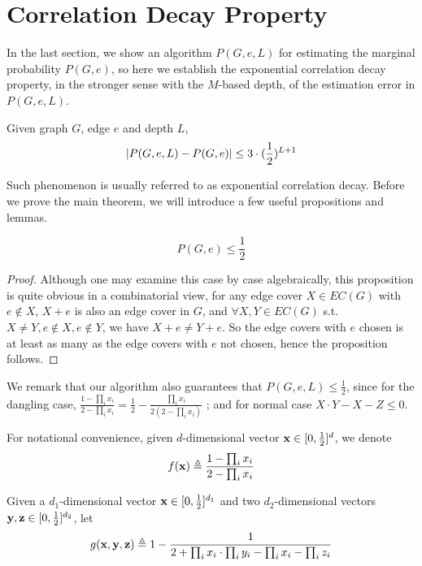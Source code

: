 \section{Correlation Decay Property}

In the last section, we show an algorithm $P(G,e,L)$ for estimating the marginal probability $P(G,e)$,
so here we establish the exponential correlation decay property, in the stronger sense with the
$M$-based depth,
of the estimation error in $P(G,e,L)$.%

\begin{theorem}
	\label{cd-main-theorem}
	Given graph $G$, edge $e$ and depth $L$,
	\[\left\vert P(G,e,L) - P(G,e)\right\vert \leq 3\cdot(\frac{1}{2})^{L+1}\]
\end{theorem}

Such phenomenon is usually referred to as exponential correlation decay. Before we prove the main theorem, we will introduce a few useful propositions and lemmas.

\begin{proposition}
	\[P(G, e) \leq \frac{1}{2}\]
\end{proposition}

\begin{proof}
	Although one may examine this case by case algebraically, this proposition is quite obvious in a combinatorial view, for any edge cover $X \in EC(G)$ with $e \notin X$, $X+e$ is also an edge cover in $G$, and $\forall X,Y \in EC(G)$ s.t. $X \neq Y, e \notin X, e\notin Y$, we have $X+e \neq Y+e$. So the edge covers with $e$ chosen is at least as many as the edge covers with $e$ not chosen, hence the proposition follows.
\end{proof}

We remark that our algorithm also guarantees that $P(G,e,L) \leq \frac{1}{2}$,
since for the dangling case, $\frac{1 - \prod_i x_i}{2 - \prod_i x_i} = \frac{1}{2} - \frac{\prod_i x_i}{2(2 - \prod_i x_i)}$ ; and for normal case $X\cdot Y - X - Z \leq 0$.

For notational convenience, given $d$-dimensional vector ${\bf x} \in [0, \frac{1}{2}]^d$, we denote
\[ f({\bf x}) \triangleq \frac{1- \prod_i x_i}{2 - \prod_i x_i}\]

Given a $d_1$-dimensional vector ${\bf x} \in [0, \frac{1}{2}]^{d_1}$ and two $d_2$-dimensional vectors ${\bf y,z} \in [0, \frac{1}{2}]^{d_2}$, let
\[ g({\bf x,y,z}) \triangleq  1- \frac{1}{2+\prod_i x_i \cdot \prod_i y_i - \prod_i x_i - \prod_i z_i} \]


